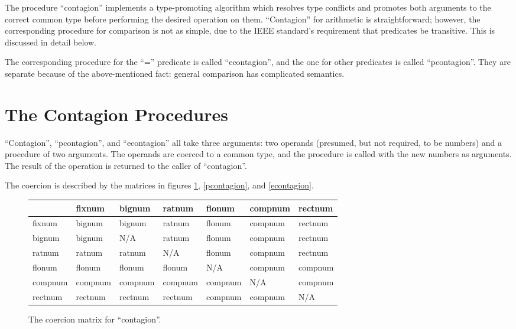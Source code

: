 The procedure ``contagion'' implements a type-promoting algorithm
which resolves type conflicts and promotes both arguments to the
correct common type before performing the desired operation on them.
``Contagion'' for arithmetic is straightforward; however, the
corresponding procedure for comparison is not as simple, due to the
IEEE standard's requirement that predicates be transitive. This is
discussed in detail below.

The corresponding procedure for the ``='' predicate is called
``econtagion'', and the one for other predicates is called
``pcontagion''. They are separate because of the above-mentioned fact:
general comparison has complicated semantics.

\section{The Contagion Procedures}

``Contagion'', ``pcontagion'', and ``econtagion'' all take three arguments:
two operands (presumed, but not required, to be numbers) and a procedure of
two arguments. The operands are coerced to a common type, and the procedure
is called with the new numbers as arguments. The result of the operation is
returned to the caller of ``contagion''.

The coercion is described by the matrices in figures \ref{contagion},
\ref{pcontagion}, and \ref{econtagion}.

\begin{figure}[hbt]
\begin{center}
\begin{tabular}{|l||l|l|l|l|l|l|} \hline
        & fixnum  & bignum  & ratnum  & flonum  & compnum & rectnum\\ \hline \hline
fixnum  & bignum  & bignum  & ratnum  & flonum  & compnum & rectnum \\ \hline
bignum  & bignum  & N/A     & ratnum  & flonum  & compnum & rectnum \\ \hline
ratnum  & ratnum  & ratnum  & N/A     & flonum  & compnum & rectnum \\ \hline
flonum  & flonum  & flonum  & flonum  & N/A     & compnum & compnum \\ \hline
compnum & compnum & compnum & compnum & compnum & N/A     & compnum \\ \hline
rectnum & rectnum & rectnum & rectnum & compnum & compnum & N/A     \\ \hline
\end{tabular}
\end{center}
\caption{The coercion matrix for ``contagion''.}
\label{contagion}
\end{figure}

